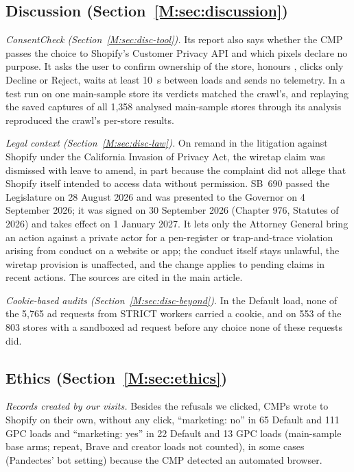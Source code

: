 \documentclass[preprint,11pt,authoryear,a4paper]{elsarticle}
\begin{document}
\subsection*{Discussion (Section~\ref*{M:sec:discussion})}

\emph{ConsentCheck (Section~\ref*{M:sec:disc-tool}).} Its report also says whether the CMP passes the choice to Shopify's Customer Privacy API and which pixels declare no purpose. It asks the user to confirm ownership of the store, honours , clicks only Decline or Reject, waits at least 10~s between loads and sends no telemetry. In a test run on one main-sample store its verdicts matched the crawl's, and replaying the saved captures of all 1,358 analysed main-sample stores through its analysis reproduced the crawl's per-store results.

\emph{Legal context (Section~\ref*{M:sec:disc-law}).} On remand in the litigation against Shopify under the California Invasion of Privacy Act, the wiretap claim was dismissed with leave to amend, in part because the complaint did not allege that Shopify itself intended to access data without permission. SB~690 passed the Legislature on 28 August 2026 and was presented to the Governor on 4 September 2026; it was signed on 30 September 2026 (Chapter 976, Statutes of 2026) and takes effect on 1 January 2027. It lets only the Attorney General bring an action against a private actor for a pen-register or trap-and-trace violation arising from conduct on a website or app; the conduct itself stays unlawful, the wiretap provision is unaffected, and the change applies to pending claims in recent actions. The sources are cited in the main article.

\emph{Cookie-based audits (Section~\ref*{M:sec:disc-beyond}).} In the Default load, none of the 5,765 ad requests from STRICT workers carried a cookie, and on 553 of the 803 stores with a sandboxed ad request before any choice none of these requests did.

\subsection*{Ethics (Section~\ref*{M:sec:ethics})}

\emph{Records created by our visits.} Besides the refusals we clicked, CMPs wrote to Shopify on their own, without any click, ``marketing: no'' in 65 Default and 111 GPC loads and ``marketing: yes'' in 22 Default and 13 GPC loads (main-sample base arms; repeat, Brave and creator loads not counted), in some cases (Pandectes' bot setting) because the CMP detected an automated browser.
\end{document}
